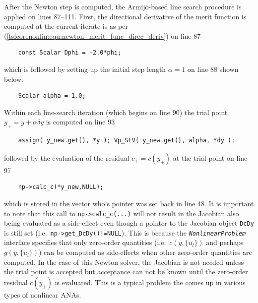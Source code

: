 After the Newton step is computed, the Armijo-based line search
procedure is applied on lines 87--111.  First, the directional
derivative of the merit function is computed at the current iterate is
as per (\ref{tsfcorenonlin:equ:newton_merit_func_direc_deriv}) on line
87
%
{\scriptsize\begin{verbatim}
    const Scalar Dphi = -2.0*phi;
\end{verbatim}}
%
\noindent{}which is followed by setting up the initial step length $\alpha = 1$
on line 88 shown below.
%
{\scriptsize\begin{verbatim}
    Scalar alpha = 1.0;
\end{verbatim}}
%
\noindent{}Within each line-search iteration (which begins on line 90) the
trial point $y_{+} = y + \alpha \delta y$ is computed on line 93
%
{\scriptsize\begin{verbatim}
    assign( y_new.get(), *y ); Vp_StV( y_new.get(), alpha, *dy );
\end{verbatim}}
%
\noindent{}followed by the evaluation of the residual $c_{+} = c(y_{+})$
at the trial point on line 97
%
{\scriptsize\begin{verbatim}
    np->calc_c(*y_new,NULL);
\end{verbatim}}
%
\noindent{}which is stored in the vector who's pointer was set back in line 48.
It is important to note that this call to \texttt{np->calc\_c(...)}
will not result in the Jacobian also being evaluated as a side-effect
even though a pointer to the Jacobian object \texttt{DcDy} is still
set (i.e.~\texttt{np->get\_DcDy()!=NULL}).  This is because the
\texttt{\textit{Nonlinear\-Problem}} interface specifies that only
zero-order quantities (i.e.~$c(y,\{u_l\})$ and perhaps $g(y,\{u_l\})$)
can be computed as side-effects when other zero-order quantities are
computed.  In the case of this Newton solver, the Jacobian is not
needed unless the trial point is accepted but acceptance can not be
known until the zero-order residual $c(y_{+})$ is evaluated.  This is
a typical problem the comes up in various types of nonlinear ANAs.

